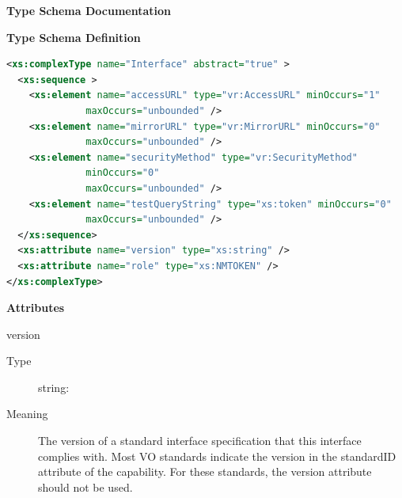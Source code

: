 \documentclass[11pt,a4paper]{ivoa}
\begin{document}
\begin{generated}
\begingroup
      	\renewcommand*\descriptionlabel[1]{%
      	\hbox to 5.5em{\emph{#1}\hfil}}\vspace{2ex}\noindent\textbf{ Type Schema Documentation}




\vspace{1ex}\noindent\textbf{ Type Schema Definition}

\begin{lstlisting}[language=XML,basicstyle=\footnotesize]
<xs:complexType name="Interface" abstract="true" >
  <xs:sequence >
    <xs:element name="accessURL" type="vr:AccessURL" minOccurs="1"
              maxOccurs="unbounded" />
    <xs:element name="mirrorURL" type="vr:MirrorURL" minOccurs="0"
              maxOccurs="unbounded" />
    <xs:element name="securityMethod" type="vr:SecurityMethod"
              minOccurs="0"
              maxOccurs="unbounded" />
    <xs:element name="testQueryString" type="xs:token" minOccurs="0"
              maxOccurs="unbounded" />
  </xs:sequence>
  <xs:attribute name="version" type="xs:string" />
  <xs:attribute name="role" type="xs:NMTOKEN" />
</xs:complexType>
\end{lstlisting}

\vspace{0.5ex}\noindent\textbf{ Attributes}

\begingroup\small\begin{bigdescription}
\item[version]
\begin{description}
\item[Type] string: 
\item[Meaning] 
               The version of a standard interface specification that this 
               interface complies with.  Most VO standards indicate the
               version in the standardID attribute of the capability.  For
               these standards, the version attribute should not be used.
            

\end{description}
\end{bigdescription}
\end{generated}
\end{document}
